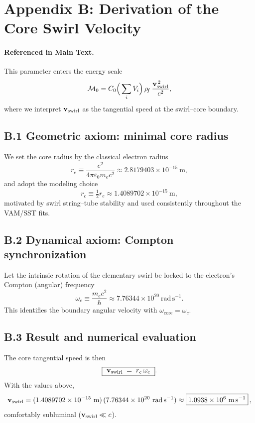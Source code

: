 \section*{Appendix B: Derivation of the Core Swirl Velocity}
\label{sec:core_swirl_velocity}

\paragraph{Referenced in Main Text.}
This parameter enters the energy scale
\[
 \mathcal{M}_0 = C_0 \Big(\sum_i V_i\Big)\,\rho_{\!f}\,\frac{\mathbf{v}_{\mathrm{swirl}}^{\,2}}{c^2},
\]
where we interpret \(\mathbf{v}_{\mathrm{swirl}}\) as the tangential speed at the swirl–core boundary.

\subsection*{B.1 Geometric axiom: minimal core radius}
We set the core radius by the classical electron radius
\[
 r_e \equiv \frac{e^2}{4\pi \varepsilon_0 m_e c^2} \approx 2.8179403\times10^{-15}\ \mathrm{m},
\]
and adopt the modeling choice
\[
 r_c \equiv \tfrac12 r_e \approx 1.4089702\times10^{-15}\ \mathrm{m},
\]
motivated by swirl string–tube stability and used consistently throughout the VAM/SST fits.

\subsection*{B.2 Dynamical axiom: Compton synchronization}
Let the intrinsic rotation of the elementary swirl be locked to the electron’s Compton (angular) frequency
\[
 \omega_c \equiv \frac{m_e c^2}{\hbar} \approx 7.76344\times10^{20}\ \mathrm{rad\,s^{-1}} .
\]
This identifies the boundary angular velocity with \(\omega_{\text{core}}=\omega_c\).

\subsection*{B.3 Result and numerical evaluation}
The core tangential speed is then
\[
 \boxed{\ \mathbf{v}_{\mathrm{swirl}} \;=\; r_c\,\omega_c\ } .
\]
With the values above,
\[
 \vswirl
 = (1.4089702\times10^{-15}\ \mathrm{m})\,(7.76344\times10^{20}\ \mathrm{rad\,s^{-1}})
    \approx \boxed{1.0938\times10^{6}\ \mathrm{m\,s^{-1}}}\,,
\]
comfortably subluminal (\(\mathbf{v}_{\mathrm{swirl}}\ll c\)).

